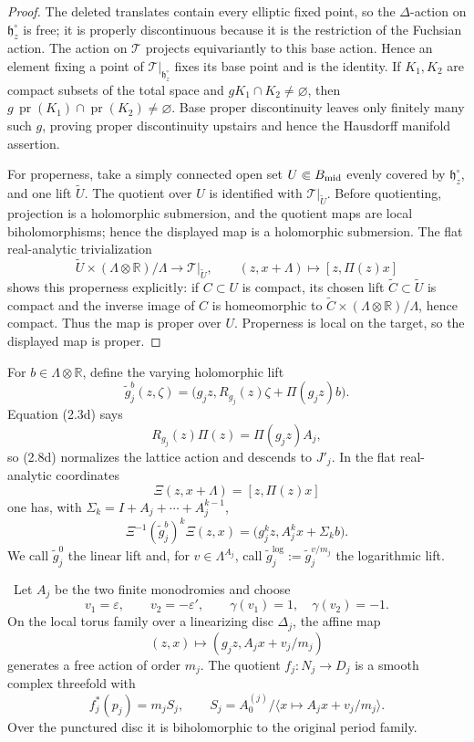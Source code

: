 \begin{proof}
The deleted translates contain every elliptic fixed point, so the
\(\Delta\)-action on \(\mathfrak h_z^\circ\) is free; it is properly
discontinuous because it is the restriction of the Fuchsian action.  The
action on \(\mathcal T\) projects equivariantly to this base action.  Hence
an element fixing a point of \(\mathcal T|_{\mathfrak h_z^\circ}\) fixes
its base point and is the identity.  If \(K_1,K_2\) are compact subsets of
the total space and \(gK_1\cap K_2\ne\varnothing\), then
\(g\,\operatorname{pr}(K_1)\cap\operatorname{pr}(K_2)\ne\varnothing\).
Base proper discontinuity leaves only finitely many such \(g\), proving
proper discontinuity upstairs and hence the Hausdorff manifold assertion.

For properness, take a simply connected open set \(U\Subset B_{\rm mid}\)
evenly covered by \(\mathfrak h_z^\circ\), and one lift \(\widetilde U\).
The quotient over \(U\) is identified with
\(\mathcal T|_{\widetilde U}\).  Before quotienting, projection is a
holomorphic submersion, and the quotient maps are local biholomorphisms;
hence the displayed map is a holomorphic submersion.  The flat real-analytic trivialization
\[
 \widetilde U\times(\Lambda\otimes\mathbb R)/\Lambda
 \longrightarrow\mathcal T|_{\widetilde U},\qquad
 (z,x+\Lambda)\longmapsto[z,\Pi(z)x]
\]
shows this properness explicitly: if \(C\subset U\) is compact, its chosen
lift \(\widetilde C\subset\widetilde U\) is compact and the inverse image of
\(C\) is homeomorphic to
\(\widetilde C\times(\Lambda\otimes\mathbb R)/\Lambda\), hence compact.
Thus the map is proper over \(U\).  Properness is local on the target, so
the displayed map is proper.
\end{proof}

For \(b\in\Lambda\otimes\mathbb R\), define the varying holomorphic lift
\[
 \widetilde g_j^{b}(z,\zeta)=
 \bigl(g_jz,R_{g_j}(z)\zeta+\Pi(g_jz)b\bigr).
 \tag{2.8d}
\]
Equation (2.3d) says
\[
 R_{g_j}(z)\Pi(z)=\Pi(g_jz)A_j,
 \tag{2.8e}
\]
so (2.8d) normalizes the lattice action and descends to \(J'_j\).  In the
flat real-analytic coordinates
\[
 \Xi(z,x+\Lambda)=[z,\Pi(z)x]
\]
one has, with \(\Sigma_k=I+A_j+\cdots+A_j^{k-1}\),
\[
 \Xi^{-1}(\widetilde g_j^{b})^k\Xi(z,x)
 =\bigl(g_j^kz,A_j^kx+\Sigma_kb\bigr).
 \tag{2.8f}
\]
We call \(\widetilde g_j^{0}\) the linear lift and, for
\(v\in\Lambda^{A_j}\), call
\(\widetilde g_j^{\log}:=\widetilde g_j^{v/m_j}\) the logarithmic lift.

\begin{proposition}
\label{wb:prop:candidate-finite-fillings}
\ Let \(A_j\) be the two finite monodromies and choose
\[
 v_1=\varepsilon,\qquad v_2=-\varepsilon',
 \qquad \gamma(v_1)=1,\quad\gamma(v_2)=-1.
\]
On the local torus family over a linearizing disc \(\Delta_j\), the affine
map
\[
 (z,x)\longmapsto(g_jz,A_jx+v_j/m_j)
\tag{2.9}
\]
generates a free action of order \(m_j\).  The quotient
\(f_j:N_j\to D_j\) is a smooth complex threefold with
\[
 f_j^*(p_j)=m_jS_j,\qquad
 S_j=A_0^{(j)}/\langle x\mapsto A_jx+v_j/m_j\rangle.
\tag{2.10}
\]
Over the punctured disc it is biholomorphic to the original period family.
\end{proposition}

